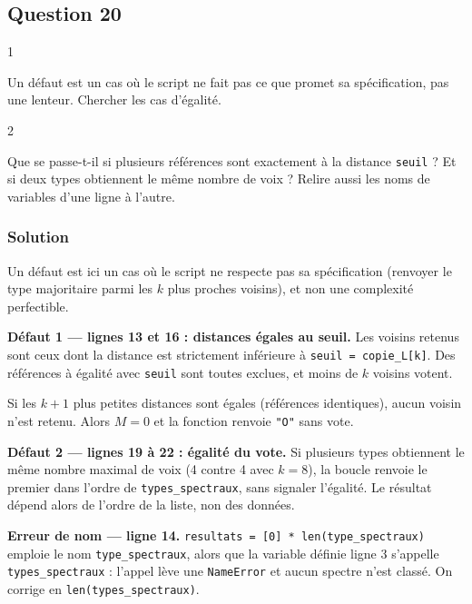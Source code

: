 \documentclass[11pt,a4paper]{article}
\begin{document}
\hypertarget{question-20}{%
\subsection{Question 20}\label{question-20}}

\begin{indication}{1}

Un défaut est un cas où le script ne fait pas ce que promet sa spécification, pas une lenteur. Chercher les cas d'égalité.

\end{indication}

\begin{indication}{2}

Que se passe-t-il si plusieurs références sont exactement à la distance \texttt{seuil} ? Et si deux types obtiennent le même nombre de voix ? Relire aussi les noms de variables d'une ligne à l'autre.

\end{indication}

\hypertarget{solution-19}{%
\subsubsection{Solution}\label{solution-19}}

Un défaut est ici un cas où le script ne respecte pas sa spécification (renvoyer le type majoritaire parmi les \(k\) plus proches voisins), et non une complexité perfectible.

\textbf{Défaut 1 --- lignes 13 et 16 : distances égales au seuil.} Les voisins retenus sont ceux dont la distance est strictement inférieure à \texttt{seuil\ =\allowbreak{}\ copie\_L{[}k{]}\allowbreak{}}. Des références à égalité avec \texttt{seuil} sont toutes exclues, et moins de \(k\) voisins votent.

Si les \(k+1\) plus petites distances sont égales (références identiques), aucun voisin n'est retenu. Alors \(M = 0\) et la fonction renvoie \texttt{"O"} sans vote.

\textbf{Défaut 2 --- lignes 19 à 22 : égalité du vote.} Si plusieurs types obtiennent le même nombre maximal de voix (4 contre 4 avec \(k = 8\)), la boucle renvoie le premier dans l'ordre de \texttt{types\_spectraux}, sans signaler l'égalité. Le résultat dépend alors de l'ordre de la liste, non des données.

\textbf{Erreur de nom --- ligne 14.} \texttt{resultats\ =\allowbreak{}\ {[}0{]}\allowbreak{}\ *\ len(\allowbreak{}type\_spectraux)\allowbreak{}} emploie le nom \texttt{type\_spectraux}, alors que la variable définie ligne 3 s'appelle \texttt{types\_spectraux} : l'appel lève une \texttt{NameError} et aucun spectre n'est classé. On corrige en \texttt{len(\allowbreak{}types\_spectraux)\allowbreak{}}.
\end{document}
